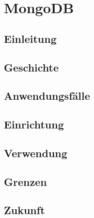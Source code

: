\section{MongoDB}
\subsection{Einleitung}
\subsection{Geschichte}
\subsection{Anwendungsfälle}
\subsection{Einrichtung}
\subsection{Verwendung}
\subsection{Grenzen}
\subsection{Zukunft}